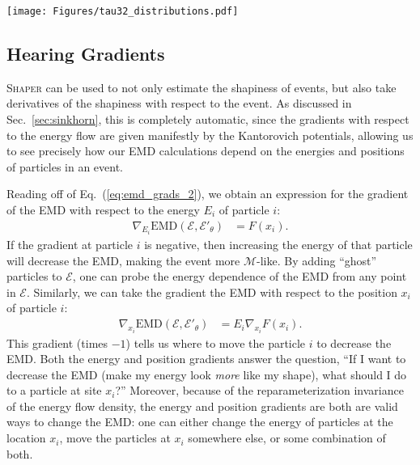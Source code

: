 \documentclass[letterpaper,11pt]{article}
\newcommand{\E}{\mathcal{E}}
\newcommand{\M}{\mathcal{M}}
\newcommand{\EMD}{\text{EMD}}
\DeclareRobustCommand{\Sec}[1]{Sec.~\ref{sec:#1}}
\DeclareRobustCommand{\Eq}[1]{Eq.~(\ref{eq:#1})}
\newcommand{\FastJet}{{\sc FastJet}\xspace}
\newcommand{\Shaper}{\textsc{Shaper}\xspace}
\begin{document}
\begin{figure*}[htbp]
    \centering

        \texttt{[image: Figures/tau32\_distributions.pdf]}

    \caption{
       Distributions of the learned $\tau_{32}$, for top jets (red) and QCD jets (blue), as calculated using \FastJet 3.4.0 (filled) and \Shaper (points) with $\epsilon^\beta = 10^{-3}$. 
        }
    \label{fig:tau32_distributions}
\end{figure*}






\subsection{Hearing Gradients}


\Shaper can be used to not only estimate the shapiness of events, but also take derivatives of the shapiness with respect to the event. As discussed in \Sec{sinkhorn}, this is completely automatic, since the gradients with respect to the energy flow are given manifestly by the Kantorovich potentials, allowing us to see precisely how our EMD calculations depend on the energies and positions of particles in an event. 

Reading off of \Eq{emd_grads_2}, we obtain an expression for the gradient of the EMD with respect to the energy $E_i$ of particle $i$:
%
\begin{align}
    \nabla_{E_i}\EMD(\E, \E'_\theta) &= F(x_i) \label{eq:z_grad}.
\end{align}
%
If the gradient at particle $i$ is negative, then increasing the energy of that particle will decrease the EMD, making the event more $\M$-like. By adding ``ghost'' particles to $\E$, one can probe the energy dependence of the EMD from any point in $\E$.
%
Similarly, we can take the gradient the EMD with respect to the position $x_i$ of particle $i$:
%
\begin{align}
    \nabla_{x_i}\EMD(\E, \E'_\theta) &= E_i \nabla_{x_i}F(x_i) \label{eq:x_grad}.
\end{align}
%
This gradient (times $-1$) tells us where to move the particle $i$ to decrease the EMD.
%
Both the energy and position gradients answer the question, ``If I want to decrease the EMD (make my energy look \emph{more} like my shape), what should I do to a particle at site $x_i$?'' Moreover, because of the reparameterization invariance of the energy flow density, the energy and position gradients are both are valid ways to change the EMD: one can either change the energy of particles at the location $x_i$, move the particles at $x_i$ somewhere else, or some combination of both. 
\end{document}
